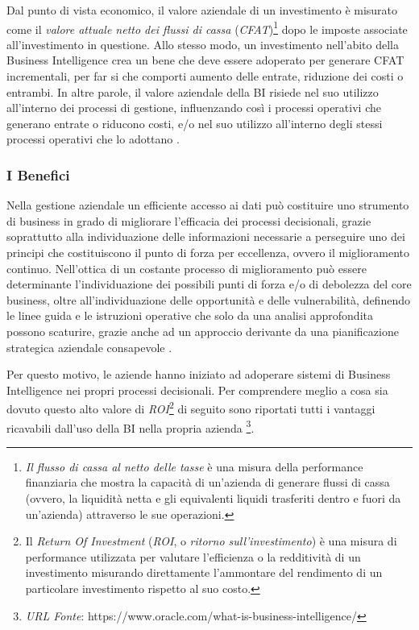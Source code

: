 Dal punto di vista economico, il valore aziendale di un investimento è misurato come il \textit{valore attuale netto dei flussi di cassa} (\textit{CFAT})\footnote{\textit{Il flusso di cassa al netto delle tasse} è una misura della performance finanziaria che mostra la capacità di un'azienda di generare flussi di cassa (ovvero, la liquidità netta e gli equivalenti liquidi trasferiti dentro e fuori da un'azienda) attraverso le sue operazioni.} dopo le imposte associate all'investimento in questione.
Allo stesso modo, un investimento nell'abito della Business Intelligence crea un bene che deve essere adoperato per generare CFAT incrementali, per far si che comporti aumento delle entrate, riduzione dei costi o entrambi. In altre parole, il valore aziendale della BI risiede nel suo utilizzo all'interno dei processi di gestione, influenzando così i processi operativi che generano entrate o riducono costi, e/o nel suo utilizzo all'interno degli stessi processi operativi che lo adottano \cite{decisionpath_bi_value}.

\subsubsection{I Benefici}

Nella gestione aziendale un efficiente accesso ai dati può costituire uno strumento di business in grado di migliorare l'efficacia dei processi decisionali, grazie soprattutto alla individuazione delle informazioni necessarie a perseguire uno dei principi che costituiscono il punto di forza per eccellenza, ovvero il miglioramento continuo. Nell'ottica di un costante processo di miglioramento può essere determinante l'individuazione dei possibili punti di forza e/o di debolezza del core business, oltre all'individuazione delle opportunità e delle vulnerabilità, definendo le linee guida e le istruzioni operative che solo da una analisi approfondita possono scaturire, grazie anche ad un approccio derivante da una pianificazione strategica aziendale consapevole \cite{dalla_bi_al_dw}.

Per questo motivo, le aziende hanno iniziato ad adoperare sistemi di Business Intelligence nei propri processi decisionali. Per comprendere meglio a cosa sia dovuto questo alto valore di \textit{ROI}\footnote{Il \textit{Return Of Investment} (\textit{ROI}, o \textit{ritorno sull'investimento}) è una misura di performance utilizzata per valutare l'efficienza o la redditività di un investimento misurando direttamente l'ammontare del rendimento di un particolare investimento rispetto al suo costo.} di seguito sono riportati tutti i vantaggi ricavabili dall'uso della BI nella propria azienda \footnote{\textit{URL Fonte}: https://www.oracle.com/what-is-business-intelligence/}.

